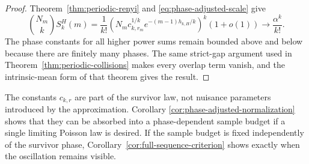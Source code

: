 \begin{proof}
Theorem~\ref{thm:periodic-renyi} and
\eqref{eq:phase-adjusted-scale} give
\[
  \binom{N_m}{k}S_k^H(m)
  =\frac1{k!}\left(
    N_mc_{k,r_m}^{1/k}e^{-(m-1)h_{k,H}/k}
  \right)^k(1+o(1))
  \longrightarrow\frac{\alpha^k}{k!}.
\]
The phase constants for all higher power sums remain bounded above and
below because there are finitely many phases.  The same strict-gap
argument used in Theorem~\ref{thm:periodic-collisions} makes every
overlap term vanish, and the intrinsic-mean form of that theorem gives
the result.
\end{proof}

\begin{remark}
The constants \(c_{k,r}\) are part of the survivor law, not nuisance
parameters introduced by the approximation.  Corollary
\ref{cor:phase-adjusted-normalization} shows that they can be absorbed
into a phase-dependent sample budget if a single limiting Poisson law is
desired.  If the sample budget is fixed independently of the survivor
phase, Corollary~\ref{cor:full-sequence-criterion} shows exactly when the
oscillation remains visible.
\end{remark}
